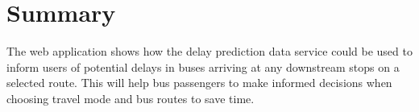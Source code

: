 \section{Summary}
\par The web application shows how the delay prediction data service could be used to inform users of potential delays in buses arriving at any downstream stops on a selected route. This will help bus passengers to make informed decisions when choosing travel mode and bus routes to save time.

